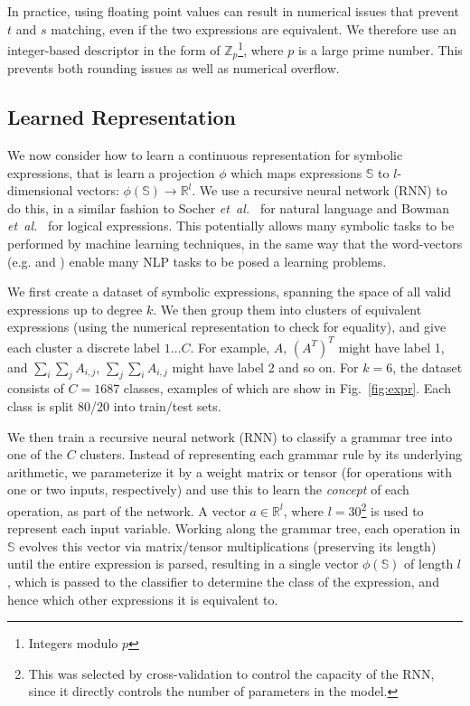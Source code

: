 \documentclass{article} %
\newcommand{\fig}[1]{Fig.~\ref{fig:#1}}
\def\etal{{\textit{et~al.~}}}
\begin{document}
In practice, using floating point values can result in numerical
issues that prevent $t$ and $s$ matching, even if the two expressions
are equivalent. We therefore use an integer-based descriptor in
the form of $\mathbb{Z}_p$\footnote{Integers modulo $p$}, 
where $p$ is a large prime number. This prevents both rounding issues
as well as numerical overflow.  

\vspace{-1mm} 
\subsection{Learned Representation}
\vspace{-1mm} 
\label{sec:learned}
We now consider how to learn a continuous representation for symbolic
expressions, that is learn a projection $\phi$ which maps expressions
$\mathbb{S}$ to $l$-dimensional vectors: $\phi(\mathbb{S}) \rightarrow \mathbb{R}^l$.  We use a recursive neural network (RNN) to do this,
in a similar fashion to Socher \etal \cite{socher2013recursive} for
natural language and Bowman \etal \cite{bowman2013can} for logical expressions.  This potentially allows many symbolic tasks to be
performed by machine learning techniques, in the same way that
the word-vectors (e.g.\cite{Collobert08} and \cite{mikolov2013efficient}) enable many NLP tasks to be posed a
learning problems. 
 

We first create a dataset of symbolic expressions, spanning the space
of all valid expressions up to degree $k$. We then group them into
clusters of equivalent expressions (using the numerical representation
to check for equality), and give each cluster a discrete label $1
\ldots C$. For example, $A$, $(A^T)^T$ might have label 1, and $\sum_i
\sum_j A_{i, j}$, $\sum_j \sum_i A_{i, j}$ might have label 2 and so
on. For $k=6$, the dataset consists of $C=1687$ classes, examples of
which are show in \fig{expr}. Each class is split 80/20 into
train/test sets.

We then train a recursive neural network (RNN) to classify a grammar
tree into one of the $C$ clusters. Instead of
representing each grammar rule by its underlying arithmetic, we
parameterize it by a weight matrix or tensor (for operations with one
or two inputs, respectively) and use this to learn the {\em concept}
of each operation, as part of the network. A vector $a \in
\mathbb{R}^l$, where $l=30$\footnote{This was selected by
  cross-validation to control the capacity of the RNN, since it
  directly controls the number of parameters in the model.} is used to represent each input variable.
Working along the grammar tree, each operation in $\mathbb{S}$ evolves this
vector via matrix/tensor multiplications (preserving its length) until the entire
expression is parsed, resulting in a single vector $\phi(\mathbb{S})$ of length $l$, which is
passed to the classifier to determine the class of the expression, and
hence which other expressions it is equivalent to. 
\end{document}
